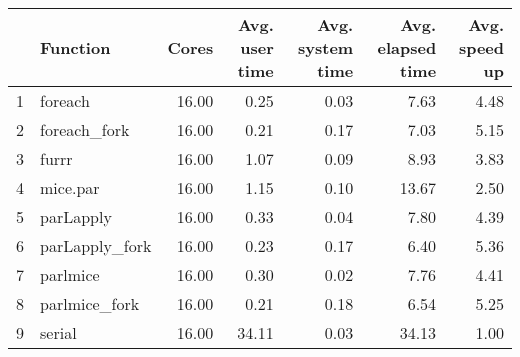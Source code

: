 \begin{table}[ht]
\centering
\begin{tabular}{rlrrrrr}
  \hline
 & Function & Cores & Avg. user time & Avg. system time & Avg. elapsed time & Avg. speed up \\ 
  \hline
1 & foreach & 16.00 & 0.25 & 0.03 & 7.63 & 4.48 \\ 
  2 & foreach\_fork & 16.00 & 0.21 & 0.17 & 7.03 & 5.15 \\ 
  3 & furrr & 16.00 & 1.07 & 0.09 & 8.93 & 3.83 \\ 
  4 & mice.par & 16.00 & 1.15 & 0.10 & 13.67 & 2.50 \\ 
  5 & parLapply & 16.00 & 0.33 & 0.04 & 7.80 & 4.39 \\ 
  6 & parLapply\_fork & 16.00 & 0.23 & 0.17 & 6.40 & 5.36 \\ 
  7 & parlmice & 16.00 & 0.30 & 0.02 & 7.76 & 4.41 \\ 
  8 & parlmice\_fork & 16.00 & 0.21 & 0.18 & 6.54 & 5.25 \\ 
  9 & serial & 16.00 & 34.11 & 0.03 & 34.13 & 1.00 \\ 
   \hline
\end{tabular}
\end{table}
